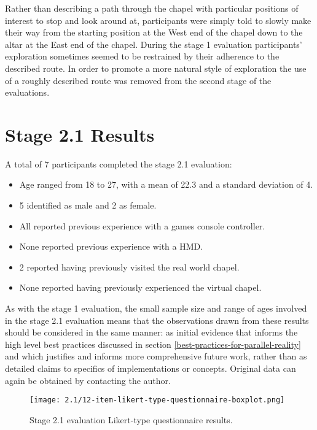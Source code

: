 Rather than describing a path through the chapel with particular positions of interest to stop and look around at, participants were simply told to slowly make their way from the starting position at the West end of the chapel down to the altar at the East end of the chapel. During the stage 1 evaluation participants' exploration sometimes seemed to be restrained by their adherence to the described route. In order to promote a more natural style of exploration the use of a roughly described route was removed from the second stage of the evaluations.


\section{Stage 2.1 Results}

A total of 7 participants completed the stage 2.1 evaluation:
\begin{itemize}
	\item Age ranged from 18 to 27, with a mean of 22.3 and a standard deviation of 4.
	\item 5 identified as male and 2 as female.
	\item All reported previous experience with a games console controller.
	\item None reported previous experience with a HMD.
	\item 2 reported having previously visited the real world chapel.
	\item None reported having previously experienced the virtual chapel.
\end{itemize}

As with the stage 1 evaluation, the small sample size and range of ages involved in the stage 2.1 evaluation means that the observations drawn from these results should be considered in the same manner: as initial evidence that informs the high level best practices discussed in section \ref{best-practices-for-parallel-reality} and which justifies and informs more comprehensive future work, rather than as detailed claims to specifics of implementations or concepts. Original data can again be obtained by contacting the author.


\begin{figure}
	\begin{center}
	\texttt{[image: 2.1/12-item-likert-type-questionnaire-boxplot.png]}
	\caption{Stage 2.1 evaluation Likert-type questionnaire results.}
	\label{2-1-12-item-likert-type-questionnaire-boxplot.png}
	\end{center}
\end{figure}

